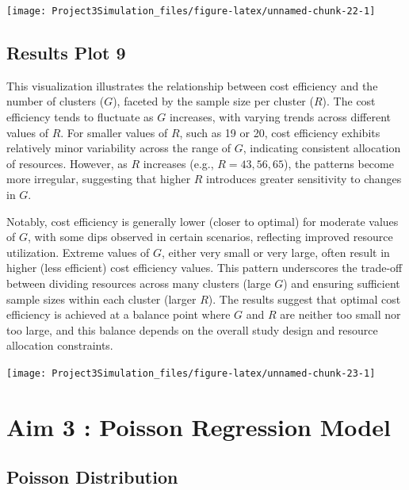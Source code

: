 \documentclass[
]{article}
\begin{document}
\begin{center}\texttt{[image: Project3Simulation\_files/figure-latex/unnamed-chunk-22-1]} \end{center}

\hypertarget{results-plot-9}{%
\subsection{Results Plot 9}\label{results-plot-9}}

This visualization illustrates the relationship between cost efficiency
and the number of clusters (\(G\)), faceted by the sample size per
cluster (\(R\)). The cost efficiency tends to fluctuate as \(G\)
increases, with varying trends across different values of \(R\). For
smaller values of \(R\), such as 19 or 20, cost efficiency exhibits
relatively minor variability across the range of \(G\), indicating
consistent allocation of resources. However, as \(R\) increases (e.g.,
\(R = 43, 56, 65\)), the patterns become more irregular, suggesting that
higher \(R\) introduces greater sensitivity to changes in \(G\).

Notably, cost efficiency is generally lower (closer to optimal) for
moderate values of \(G\), with some dips observed in certain scenarios,
reflecting improved resource utilization. Extreme values of \(G\),
either very small or very large, often result in higher (less efficient)
cost efficiency values. This pattern underscores the trade-off between
dividing resources across many clusters (large \(G\)) and ensuring
sufficient sample sizes within each cluster (larger \(R\)). The results
suggest that optimal cost efficiency is achieved at a balance point
where \(G\) and \(R\) are neither too small nor too large, and this
balance depends on the overall study design and resource allocation
constraints.

\begin{center}\texttt{[image: Project3Simulation\_files/figure-latex/unnamed-chunk-23-1]} \end{center}

\hypertarget{aim-3-poisson-regression-model}{%
\section{Aim 3 : Poisson Regression
Model}\label{aim-3-poisson-regression-model}}

\hypertarget{poisson-distribution}{%
\subsection{Poisson Distribution}\label{poisson-distribution}}
\end{document}
